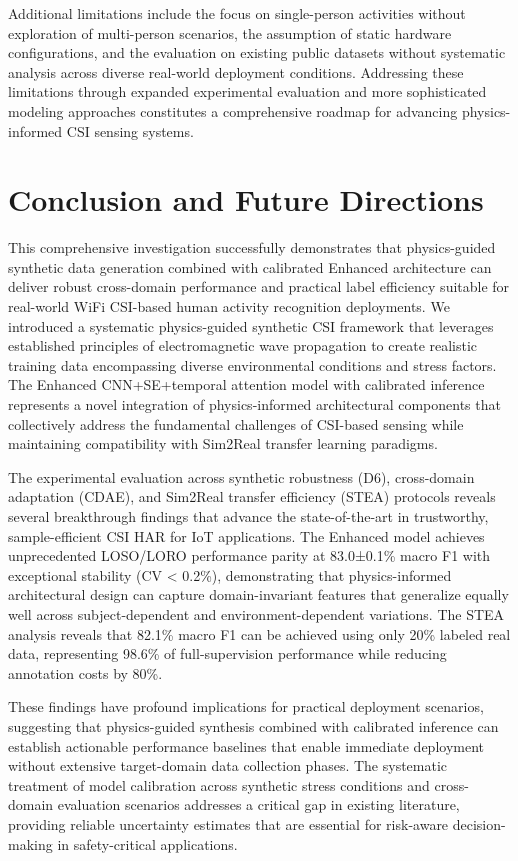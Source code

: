 \documentclass[journal]{IEEEtran}
\begin{document}
Additional limitations include the focus on single-person activities without exploration of multi-person scenarios, the assumption of static hardware configurations, and the evaluation on existing public datasets without systematic analysis across diverse real-world deployment conditions. Addressing these limitations through expanded experimental evaluation and more sophisticated modeling approaches constitutes a comprehensive roadmap for advancing physics-informed CSI sensing systems.

\section{Conclusion and Future Directions}

This comprehensive investigation successfully demonstrates that physics-guided synthetic data generation combined with calibrated Enhanced architecture can deliver robust cross-domain performance and practical label efficiency suitable for real-world WiFi CSI-based human activity recognition deployments. We introduced a systematic physics-guided synthetic CSI framework that leverages established principles of electromagnetic wave propagation to create realistic training data encompassing diverse environmental conditions and stress factors. The Enhanced CNN+SE+temporal attention model with calibrated inference represents a novel integration of physics-informed architectural components that collectively address the fundamental challenges of CSI-based sensing while maintaining compatibility with Sim2Real transfer learning paradigms.

The experimental evaluation across synthetic robustness (D6), cross-domain adaptation (CDAE), and Sim2Real transfer efficiency (STEA) protocols reveals several breakthrough findings that advance the state-of-the-art in trustworthy, sample-efficient CSI HAR for IoT applications. The Enhanced model achieves unprecedented LOSO/LORO performance parity at 83.0±0.1\% macro F1 with exceptional stability (CV < 0.2\%), demonstrating that physics-informed architectural design can capture domain-invariant features that generalize equally well across subject-dependent and environment-dependent variations. The STEA analysis reveals that 82.1\% macro F1 can be achieved using only 20\% labeled real data, representing 98.6\% of full-supervision performance while reducing annotation costs by 80\%.

These findings have profound implications for practical deployment scenarios, suggesting that physics-guided synthesis combined with calibrated inference can establish actionable performance baselines that enable immediate deployment without extensive target-domain data collection phases. The systematic treatment of model calibration across synthetic stress conditions and cross-domain evaluation scenarios addresses a critical gap in existing literature, providing reliable uncertainty estimates that are essential for risk-aware decision-making in safety-critical applications.
\end{document}
